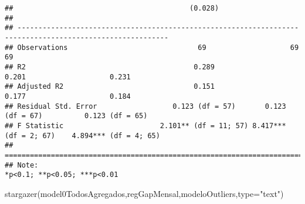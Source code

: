 \documentclass[
]{article}
\newenvironment{Shaded}{\begin{snugshade}}{\end{snugshade}}
\newcommand{\AttributeTok}[1]{\textcolor[rgb]{0.77,0.63,0.00}{#1}}
\newcommand{\FunctionTok}[1]{\textcolor[rgb]{0.00,0.00,0.00}{#1}}
\newcommand{\NormalTok}[1]{#1}
\newcommand{\StringTok}[1]{\textcolor[rgb]{0.31,0.60,0.02}{#1}}
\begin{document}
\begin{verbatim}
##                                          (0.028)                                                          
##                                                                                                           
## ----------------------------------------------------------------------------------------------------------
## Observations                               69                    69                        69             
## R2                                        0.289                 0.201                    0.231            
## Adjusted R2                               0.151                 0.177                    0.184            
## Residual Std. Error                  0.123 (df = 57)       0.123 (df = 67)          0.123 (df = 65)       
## F Statistic                       2.101** (df = 11; 57) 8.417*** (df = 2; 67)    4.894*** (df = 4; 65)    
## ==========================================================================================================
## Note:                                                                          *p<0.1; **p<0.05; ***p<0.01
\end{verbatim}

\begin{Shaded}
\begin{Highlighting}[]
\FunctionTok{stargazer}\NormalTok{(model0TodosAgregados,regGapMensal,modeloOutliers,}\AttributeTok{type=}\StringTok{"text"}\NormalTok{)}
\end{Highlighting}
\end{Shaded}
\end{document}

